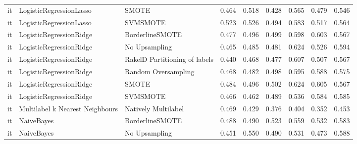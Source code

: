 \begin{tabular}{lllllllll}
      it &         LogisticRegressionLasso &                         SMOTE & 0.464 &                     0.518 &                 0.428 &                  0.565 &                                   0.479 &     0.546 \\
      it &         LogisticRegressionLasso &                      SVMSMOTE & 0.523 &                     0.526 &                 0.494 &                  0.583 &                                   0.517 &     0.564 \\
      it &         LogisticRegressionRidge &               BorderlineSMOTE & 0.477 &                     0.496 &                 0.499 &                  0.598 &                                   0.603 &     0.567 \\
      it &         LogisticRegressionRidge &                 No Upsampling & 0.465 &                     0.485 &                 0.481 &                  0.624 &                                   0.526 &     0.594 \\
      it &         LogisticRegressionRidge & RakelD Partitioning of labels & 0.440 &                     0.468 &                 0.477 &                  0.607 &                                   0.507 &     0.567 \\
      it &         LogisticRegressionRidge &           Random Oversampling & 0.468 &                     0.482 &                 0.498 &                  0.595 &                                   0.588 &     0.575 \\
      it &         LogisticRegressionRidge &                         SMOTE & 0.484 &                     0.496 &                 0.502 &                  0.624 &                                   0.605 &     0.567 \\
      it &         LogisticRegressionRidge &                      SVMSMOTE & 0.466 &                     0.462 &                 0.489 &                  0.536 &                                   0.584 &     0.585 \\
      it & Multilabel k Nearest Neighbours &           Natively Multilabel & 0.469 &                     0.429 &                 0.376 &                  0.404 &                                   0.352 &     0.453 \\
      it &                      NaiveBayes &               BorderlineSMOTE & 0.488 &                     0.490 &                 0.523 &                  0.559 &                                   0.532 &     0.583 \\
      it &                      NaiveBayes &                 No Upsampling & 0.451 &                     0.550 &                 0.490 &                  0.531 &                                   0.473 &     0.588 \\

\end{tabular}
